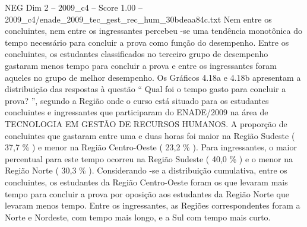 \begin{textsample}{NEG Dim 2 – 2009\_c4 – Score 1.00 – 2009\_c4/enade\_2009\_tec\_gest\_rec\_hum\_30bdeaa84c.txt}
Nem entre os concluintes, nem entre os ingressantes percebeu -se uma tendência monotônica do tempo necessário para concluir a prova como função do desempenho.
Entre os concluintes, os estudantes classificados no terceiro grupo de desempenho gastaram menos tempo para concluir a prova e entre os ingressantes foram aqueles no grupo de melhor desempenho.
Os Gráficos 4.18a e 4.18b apresentam a distribuição das respostas à questão “ Qual foi o tempo gasto para concluir a prova? ”, segundo a Região onde o curso está situado para os estudantes concluintes e ingressantes que participaram do ENADE/2009 na área de TECNOLOGIA EM GESTÃO DE RECURSOS HUMANOS.
A proporção de concluintes que gastaram entre uma e duas horas foi maior na Região Sudeste ( 37,7 \% ) e menor na Região Centro-Oeste ( 23,2 \% ).
Para ingressantes, o maior percentual para este tempo ocorreu na Região Sudeste ( 40,0 \% ) e o menor na Região Norte ( 30,3 \% ).
Considerando -se a distribuição cumulativa, entre os concluintes, os estudantes da Região Centro-Oeste foram os que levaram mais tempo para concluir a prova por oposição aos estudantes da Região Norte que levaram menos tempo.
Entre os ingressantes, as Regiões correspondentes foram a Norte e Nordeste, com tempo mais longo, e a Sul com tempo mais curto.

\end{textsample}
